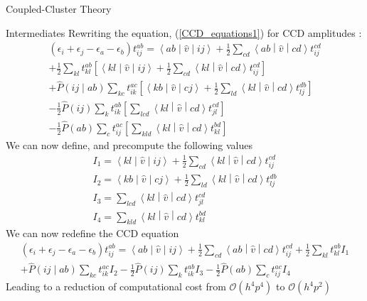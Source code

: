 \documentclass[twoside,english]{uiofysmaster}
\begin{document}
\begin{chapter}{Coupled-Cluster Theory}
\begin{section}{Intermediates}
  		Rewriting the equation, (\ref{CCD_equations1}) for CCD amplitudes \cite{Baardsen,Audun}:
  		\begin{align}
  			(\epsilon_i + \epsilon_j - \epsilon_a - \epsilon_b) t_{ij}^{ab} = \left<ab\middle|\hat v\middle|ij\right> + \frac{1}{2} \sum_{cd}\left<ab\middle|\hat v\middle|cd\right>t_{ij}^{cd} \\
  			+ \frac{1}{2} \sum_{kl} t_{kl}^{ab} \left[ \left<kl\middle|\hat v\middle|ij\right> + \frac{1}{2} \sum_{cd} \left<kl\middle|\hat v\middle|cd\right> t_{ij}^{cd} \right] \\
  			+ \hat P\left(ij\middle|ab\right) \sum_{kc} t_{ik}^{ac} \left[ \left<kb\middle|\hat v\middle|cj\right> + \frac{1}{2}\sum_{ld}\left<kl\middle|\hat v\middle|cd\right>t_{lj}^{db} \right] \\
  			- \frac{1}{2} \hat P(ij) \sum_{k} t_{ik}^{ab} \left[ \sum_{lcd} \left<kl\middle|\hat v\middle|cd\right> t_{jl}^{cd} \right] \\
  			- \frac{1}{2} \hat P(ab) \sum_{c} t_{ij}^{ac} \left[ \sum_{kld} \left<kl\middle|\hat v\middle|cd\right> t_{kl}^{bd} \right]
  		\end{align}
  		We can now define, and precompute the following values
  		\begin{align}
  			I_1 = \left<kl\middle|\hat v\middle|ij\right> + \frac{1}{2} \sum_{cd} \left<kl\middle|\hat v\middle|cd\right> t_{ij}^{cd} \\
  			I_2 = \left<kb\middle|\hat v\middle|cj\right> + \frac{1}{2}\sum_{ld}\left<kl\middle|\hat v\middle|cd\right>t_{lj}^{db} \\
  			I_3 = \sum_{lcd} \left<kl\middle|\hat v\middle|cd\right> t_{jl}^{cd} \\
  			I_4 = \sum_{kld} \left<kl\middle|\hat v\middle|cd\right> t_{kl}^{bd}
  		\end{align}
  		We can now redefine the CCD equation 
  		\begin{align}
  			(\epsilon_i + \epsilon_j - \epsilon_a - \epsilon_b) t_{ij}^{ab} = \left<ab\middle|\hat v\middle|ij\right> + \frac{1}{2} \sum_{cd}\left<ab\middle|\hat v\middle|cd\right>t_{ij}^{cd} + \frac{1}{2} \sum_{kl} t_{kl}^{ab} I_1 \\
  			+ \hat P\left(ij\middle|ab\right) \sum_{kc} t_{ik}^{ac} I_2 - \frac{1}{2} \hat P(ij) \sum_{k} t_{ik}^{ab} I_3  - \frac{1}{2} \hat P(ab) \sum_{c} t_{ij}^{ac} I_4
  			\label{Intermediates}
  		\end{align}
  		Leading to a reduction of computational cost from $\mathcal{O}(h^4 p^4)$ to $\mathcal{O}(h^4 p^2)$


  	\end{section}

\end{chapter}
\end{document}
